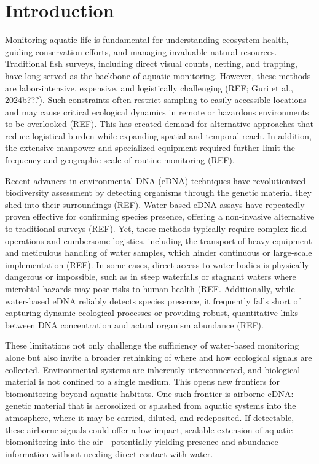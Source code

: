 \documentclass{article}
\begin{document}
\section{Introduction}
Monitoring aquatic life is fundamental for understanding ecosystem health, guiding conservation efforts, and managing invaluable natural resources. Traditional fish surveys, including direct visual counts, netting, and trapping, have long served as the backbone of aquatic monitoring. However, these methods are labor-intensive, expensive, and logistically challenging (REF; Guri et al., 2024b???). Such constraints often restrict sampling to easily accessible locations and may cause critical ecological dynamics in remote or hazardous environments to be overlooked (REF). This has created demand for alternative approaches that reduce logistical burden while expanding spatial and temporal reach. In addition, the extensive manpower and specialized equipment required further limit the frequency and geographic scale of routine monitoring (REF).  

Recent advances in environmental DNA (eDNA) techniques have revolutionized biodiversity assessment by detecting organisms through the genetic material they shed into their surroundings (REF). Water-based eDNA assays have repeatedly proven effective for confirming species presence, offering a non-invasive alternative to traditional surveys (REF). Yet, these methods typically require complex field operations and cumbersome logistics, including the transport of heavy equipment and meticulous handling of water samples, which hinder continuous or large-scale implementation (REF). In some cases, direct access to water bodies is physically dangerous or impossible, such as in steep waterfalls or stagnant waters where microbial hazards may pose risks to human health (REF. Additionally, while water-based eDNA reliably detects species presence, it frequently falls short of capturing dynamic ecological processes or providing robust, quantitative links between DNA concentration and actual organism abundance (REF).

 These limitations not only challenge the sufficiency of water-based monitoring alone but also invite a broader rethinking of where and how ecological signals are collected. Environmental systems are inherently interconnected, and biological material is not confined to a single medium. This opens new frontiers for biomonitoring beyond aquatic habitats. One such frontier is airborne eDNA: genetic material that is aerosolized or splashed from aquatic systems into the atmosphere, where it may be carried, diluted, and redeposited. If detectable, these airborne signals could offer a low-impact, scalable extension of aquatic biomonitoring into the air—potentially yielding presence and abundance information without needing direct contact with water.
\end{document}
